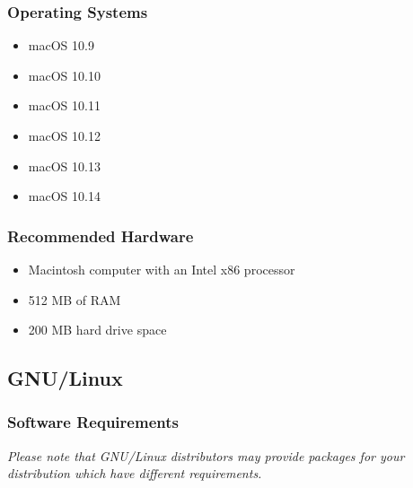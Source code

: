 \documentclass{article}
\begin{document}
\subsubsection*{Operating Systems}\label{operating-systems}

\begin{samepage}
	\begin{itemize}
		\item macOS 10.9
		\item macOS 10.10
		\item macOS 10.11
		\item macOS 10.12
		\item macOS 10.13
		\item macOS 10.14
	\end{itemize}
\end{samepage}

\subsubsection*{Recommended Hardware}\label{recommended-hardware_1}

\begin{samepage}
	\begin{itemize}
		\item Macintosh computer with an Intel x86 processor
		\item 512 MB of RAM
		\item 200 MB hard drive space
	\end{itemize}
\end{samepage}

\subsection*{GNU/Linux}\label{gnulinux}

\subsubsection*{Software Requirements}\label{software-requirements}

\emph{Please note that GNU/Linux distributors may provide packages for your
	distribution which have different requirements.}
\end{document}

